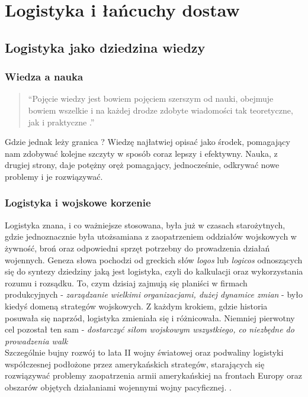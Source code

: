\chapter{Logistyka i łańcuchy dostaw}
\label{c2:c2}

\section{Logistyka jako dziedzina wiedzy}
	\subsection{Wiedza a nauka}	
		\begin{quote}
			``Pojęcie wiedzy jest bowiem pojęciem szerszym od nauki,
			obejmuje bowiem wszelkie i na każdej drodze zdobyte wiadomości
			tak teoretyczne, jak i praktyczne \cite{organizacja_badan_ocen_prac_naukowych}.''
		\end{quote}
		
		Gdzie jednak leży granica ? Wiedzę najłatwiej opisać jako środek, pomagający 
		nam zdobywać kolejne szczyty w sposób coraz lepszy i efektywny. Nauka, z drugiej strony,
		daje potężny oręż pomagający, jednocześnie, odkrywać nowe problemy i je rozwiązywać.
		
	\subsection{Logistyka i wojskowe korzenie}
		Logistyka znana, i co ważniejsze stosowana, była już w czasach starożytnych, gdzie jednoznacznie
		była utożsamiana z zaopatrzeniem oddziałów wojskowych w żywność, broń oraz odpowiedni
		sprzęt potrzebny do prowadzenia działań wojennych. Geneza słowa pochodzi od greckich
		słów \emph{logos} lub \emph{logicos} odnoszących się do syntezy dziedziny jaką jest logistyka,
		czyli do kalkulacji oraz wykorzystania rozumu i rozsądku. To, czym dzisiaj zajmują się planiści w 
		firmach produkcyjnych - \emph{zarządzanie wielkimi organizacjami, dużej dynamice zmian} - było kiedyś 
		domeną strategów wojskowych. Z każdym krokiem, gdzie historia posuwała
		się naprzód, logistyka zmieniała się i różnicowała. Niemniej pierwotny cel pozostał ten sam - 
		\emph{dostarczyć siłom wojskowym wszystkiego, co niezbędne do prowadzenia walk} \\
		
		Szczególnie bujny rozwój to lata II wojny światowej oraz podwaliny logistyki współczesnej
		podłożone przez amerykańskich strategów, starających się rozwiązywać problemy zaopatrzenia
		armii amerykańskiej na frontach Europy oraz obszarów objętych działaniami wojennymi wojny pacyficznej. 
		\cite{logistyka_w_przedsiebiorstwie}\cite{logistyka_jako_dziedzina_wiedzy_cz1}.
		
